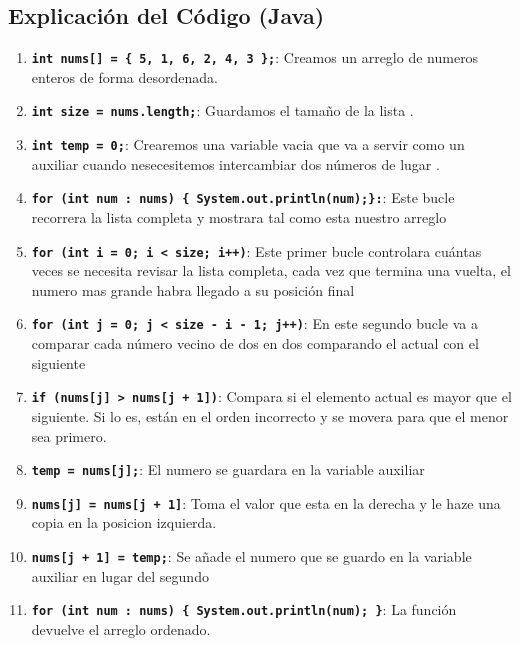 \documentclass[
  spanish,
  letterpaper,
  DIV=11,
  numbers=noendperiod]{scrreprt}
\providecommand{\tightlist}{%
  \setlength{\itemsep}{0pt}\setlength{\parskip}{0pt}}
\begin{document}
\subsection{Explicación del Código
(Java)}\label{explicaciuxf3n-del-cuxf3digo-java}

\begin{enumerate}
\def\labelenumi{\arabic{enumi}.}
\tightlist
\item
  \textbf{\texttt{int\ nums{[}{]}\ =\ \{\ 5,\ 1,\ 6,\ 2,\ 4,\ 3\ \};}}:
  Creamos un arreglo de numeros enteros de forma desordenada.
\item
  \textbf{\texttt{int\ size\ =\ nums.length;}}: Guardamos el tamaño de
  la lista .
\item
  \textbf{\texttt{int\ temp\ =\ 0;}}: Crearemos una variable vacia que
  va a servir como un auxiliar cuando nesecesitemos intercambiar dos
  números de lugar .
\item
  \textbf{\texttt{for\ (int\ num\ :\ nums)\ \{\ System.out.println(num);\}:}}:
  Este bucle recorrera la lista completa y mostrara tal como esta
  nuestro arreglo
\item
  \textbf{\texttt{for\ (int\ i\ =\ 0;\ i\ \textless{}\ size;\ i++)}}:
  Este primer bucle controlara cuántas veces se necesita revisar la
  lista completa, cada vez que termina una vuelta, el numero mas grande
  habra llegado a su posición final
\item
  \textbf{\texttt{for\ (int\ j\ =\ 0;\ j\ \textless{}\ size\ -\ i\ -\ 1;\ j++)}}:
  En este segundo bucle va a comparar cada número vecino de dos en dos
  comparando el actual con el siguiente
\item
  \textbf{\texttt{if\ (nums{[}j{]}\ \textgreater{}\ nums{[}j\ +\ 1{]})}}:
  Compara si el elemento actual es mayor que el siguiente. Si lo es,
  están en el orden incorrecto y se movera para que el menor sea
  primero.
\item
  \textbf{\texttt{temp\ =\ nums{[}j{]};}}: El numero se guardara en la
  variable auxiliar
\item
  \textbf{\texttt{nums{[}j{]}\ =\ nums{[}j\ +\ 1{]}}}: Toma el valor que
  esta en la derecha y le haze una copia en la posicion izquierda.
\item
  \textbf{\texttt{nums{[}j\ +\ 1{]}\ =\ temp;}}: Se añade el numero que
  se guardo en la variable auxiliar en lugar del segundo
\item
  \textbf{\texttt{for\ (int\ num\ :\ nums)\ \{\ System.out.println(num);\ \}}}:
  La función devuelve el arreglo ordenado.
\end{enumerate}
\end{document}
